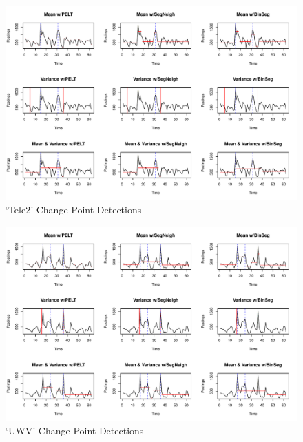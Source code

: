 \documentclass[../main.tex]{subfiles}
\begin{document}
\begin{figure}[h]
    \includegraphics[width=\textwidth]{figures/tele2results}
    \caption{`Tele2' Change Point Detections}
    \label{fig:tele2}
\end{figure}


\begin{figure}[h]
    \includegraphics[width=\textwidth]{figures/uwvresults}
    \caption{`UWV' Change Point Detections}
    \label{fig:uwv}
\end{figure}
\end{document}
